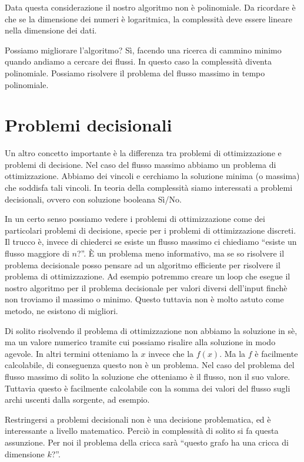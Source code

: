 Data questa considerazione il nostro algoritmo non è polinomiale. Da ricordare è che se la
dimensione dei numeri è logaritmica, la complessità deve essere lineare nella dimensione dei dati.

Possiamo migliorare l'algoritmo? Sì, facendo una ricerca di cammino minimo quando andiamo a cercare
dei flussi. In questo caso la complessità diventa polinomiale. Possiamo risolvere il problema del
flusso massimo in tempo polinomiale.

\section{Problemi decisionali}

Un altro concetto importante è la differenza tra problemi di ottimizzazione e problemi di
decisione. Nel caso del flusso massimo abbiamo un problema di ottimizzazione. Abbiamo dei vincoli e
cerchiamo la soluzione minima (o massima) che soddisfa tali vincoli. In teoria della complessità
siamo interessati a problemi decisionali, ovvero con soluzione booleana Sì/No.

In un certo senso possiamo vedere i problemi di ottimizzazione come dei particolari problemi di
decisione, specie per i problemi di ottimizzazione discreti. Il trucco è, invece di chiederci se
esiste un flusso massimo ci chiediamo ``esiste un flusso maggiore di $n$?''. È un problema meno
informativo, ma se so risolvere il problema decisionale posso pensare ad un algoritmo efficiente per
risolvere il problema di ottimizzazione. Ad esempio potremmo creare un loop che esegue il nostro
algoritmo per il problema decisionale per valori diversi dell'input finchè non troviamo il massimo o
minimo. Questo tuttavia non è molto astuto come metodo, ne esistono di migliori.

Di solito risolvendo il problema di ottimizzazione non abbiamo la soluzione in sè, ma un valore
numerico tramite cui possiamo risalire alla soluzione in modo agevole. In altri termini otteniamo la
$x$ invece che la $f(x)$. Ma la $f$ è facilmente calcolabile, di conseguenza questo non è un
problema. Nel caso del problema del flusso massimo di solito la soluzione che otteniamo è il flusso,
non il suo valore. Tuttavia questo è facilmente calcolabile con la somma dei valori del flusso
sugli archi uscenti dalla sorgente, ad esempio.

Restringersi a problemi decisionali non è una decisione problematica, ed è interessante a livello
matematico. Perciò in complessità di solito si fa questa assunzione. Per noi il problema della
cricca sarà ``questo grafo ha una cricca di dimensione $k$?''.


